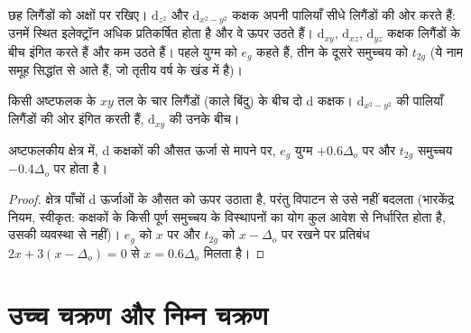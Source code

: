 छह लिगैंडों को अक्षों पर रखिए। $\mathrm d_{z^2}$ और $\mathrm d_{x^2-y^2}$
कक्षक अपनी पालियाँ सीधे लिगैंडों की ओर करते हैं: उनमें स्थित इलेक्ट्रॉन अधिक प्रतिकर्षित होता है
और वे ऊपर उठते हैं। $\mathrm d_{xy}$, $\mathrm d_{xz}$, $\mathrm d_{yz}$ कक्षक
लिगैंडों के बीच इंगित करते हैं और कम उठते हैं। पहले युग्म को $e_g$ कहते हैं, तीन के दूसरे समुच्चय को
$t_{2g}$ (ये नाम समूह सिद्धांत से आते हैं, जो तृतीय वर्ष के खंड में है)।

\begin{omfigure}

{\small किसी अष्टफलक के $xy$ तल के चार लिगैंडों (काले बिंदु) के बीच दो d कक्षक।
$\mathrm d_{x^2-y^2}$ की पालियाँ लिगैंडों की ओर इंगित करती हैं,
$\mathrm d_{xy}$ की उनके बीच।}
\end{omfigure}

\begin{theorem}[भारकेंद्र]\label{thm:b2:ligand-field:barycentre}
अष्टफलकीय क्षेत्र में, d कक्षकों की औसत ऊर्जा से मापने पर,
$e_g$ युग्म $+0.6\Delta_o$ पर और $t_{2g}$ समुच्चय $-0.4\Delta_o$ पर होता है।
\end{theorem}

\begin{proof}
क्षेत्र पाँचों d ऊर्जाओं के औसत को ऊपर उठाता है, परंतु विपाटन से उसे नहीं बदलता
(भारकेंद्र नियम, स्वीकृत: कक्षकों के किसी पूर्ण समुच्चय के विस्थापनों का योग
कुल आवेश से निर्धारित होता है, उसकी व्यवस्था से नहीं)। $e_g$ को $x$ पर और
$t_{2g}$ को $x - \Delta_o$ पर रखने पर प्रतिबंध $2x + 3(x - \Delta_o) = 0$ से $x = 0.6\Delta_o$ मिलता है।
\end{proof}

\section{उच्च चक्रण और निम्न चक्रण}

